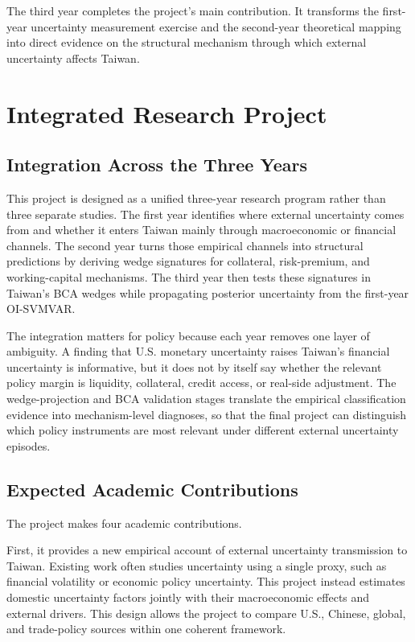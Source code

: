 \documentclass[12pt]{article}
\begin{document}
The third year completes the project's main contribution. It transforms the first-year uncertainty
measurement exercise and the second-year theoretical mapping into direct evidence on the
structural mechanism through which external uncertainty affects Taiwan.

\section{Integrated Research Project}

\subsection{Integration Across the Three Years}

This project is designed as a unified three-year research program rather than three separate
studies. The first year identifies where external uncertainty comes from and whether it enters
Taiwan mainly through macroeconomic or financial channels. The second year turns those
empirical channels into structural predictions by deriving wedge signatures for collateral,
risk-premium, and working-capital mechanisms. The third year then tests these signatures in
Taiwan's BCA wedges while propagating posterior uncertainty from the first-year OI-SVMVAR.

The integration matters for policy because each year removes one layer of ambiguity. A finding
that U.S. monetary uncertainty raises Taiwan's financial uncertainty is informative, but it does
not by itself say whether the relevant policy margin is liquidity, collateral, credit access, or
real-side adjustment. The wedge-projection and BCA validation stages translate the empirical
classification evidence into mechanism-level diagnoses, so that the final project can distinguish
which policy instruments are most relevant under different external uncertainty episodes.

\subsection{Expected Academic Contributions}

The project makes four academic contributions.

First, it provides a new empirical account of external uncertainty transmission to Taiwan. Existing
work often studies uncertainty using a single proxy, such as financial volatility or economic policy
uncertainty. This project instead estimates domestic uncertainty factors jointly with their
macroeconomic effects and external drivers. This design allows the project to compare U.S.,
Chinese, global, and trade-policy sources within one coherent framework.
\end{document}
